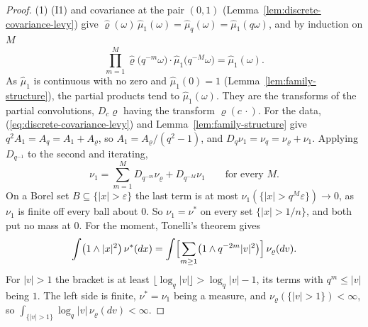 \begin{proof}
\leanok
{}
(1) (I1) and covariance at the pair $(0, 1)$ (Lemma~\ref{lem:discrete-covariance-levy}) give
$\widehat\varrho(\omega)\,\widehat\mu_1(\omega) = \widehat\mu_q(\omega) = \widehat\mu_1(q\omega)$, and by
induction on $M$
\[
  \prod_{m=1}^{M}\widehat\varrho\bigl(q^{-m}\omega\bigr)\cdot\widehat\mu_1\bigl(q^{-M}\omega\bigr)
  = \widehat\mu_1(\omega).
\]
As $\widehat\mu_1$ is continuous with no zero and $\widehat\mu_1(0) = 1$
(Lemma~\ref{lem:family-structure}), the partial products tend to $\widehat\mu_1(\omega)$. They are the
transforms of the partial convolutions, $D_c\varrho$ having the transform $\widehat\varrho(c\,\cdot)$.
For the data, (\ref{eq:discrete-covariance-levy}) and Lemma~\ref{lem:family-structure} give
$q^2A_1 = A_q = A_1 + A_\varrho$, so $A_1 = A_\varrho/(q^2 - 1)$, and
$D_q\nu_1 = \nu_q = \nu_\varrho + \nu_1$. Applying $D_{q^{-1}}$
to the second and iterating,
\[
  \nu_1 = \sum_{m=1}^{M}D_{q^{-m}}\nu_\varrho + D_{q^{-M}}\nu_1 \qquad\text{for every } M.
\]
On a Borel set $B \subseteq \{|x| > \varepsilon\}$ the last term is at most
$\nu_1(\{|x| > q^M\varepsilon\}) \to 0$, as $\nu_1$ is finite off every ball about $0$. So
$\nu_1 = \nu^*$ on every set $\{|x| > 1/n\}$, and both put no mass at $0$. For the moment,
Tonelli's theorem gives
\begin{equation}
\label{eq:ladder-tonelli}
  \int\bigl(1 \wedge |x|^2\bigr)\,\nu^*(dx) = \int\Bigl[\sum_{m \ge 1}\bigl(1 \wedge q^{-2m}|v|^2\bigr)\Bigr]\,\nu_\varrho(dv).
\end{equation}
For $|v| > 1$ the bracket is at least $\lfloor\log_q|v|\rfloor > \log_q|v| - 1$, its terms with
$q^m \le |v|$ being $1$. The left side is finite, $\nu^* = \nu_1$ being a \Levy{} measure, and
$\nu_\varrho(\{|v| > 1\}) < \infty$, so $\int_{\{|v| > 1\}}\log_q|v|\,\nu_\varrho(dv) < \infty$.


\end{proof}

